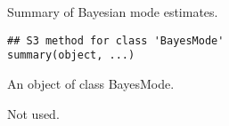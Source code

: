 \documentclass[a4paper]{book}
\begin{document}
%
\begin{Description}\relax
Summary of Bayesian mode estimates.
\end{Description}
%
\begin{Usage}
\begin{verbatim}
## S3 method for class 'BayesMode'
summary(object, ...)
\end{verbatim}
\end{Usage}
%
\begin{Arguments}
\begin{ldescription}
\item[\code{object}] An object of class BayesMode.

\item[\code{...}] Not used.
\end{ldescription}
\end{Arguments}
\printindex{}
\end{document}
